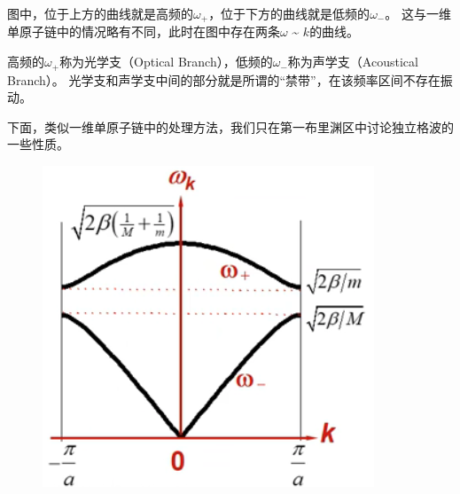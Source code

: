 \documentclass[declarePage]{ecnuthesis}
\begin{document}
图中，位于上方的曲线就是高频的$\omega_+$，位于下方的曲线就是低频的$\omega_-$。%
这与一维单原子链中的情况略有不同，此时在图中存在两条$\omega$ \~{} $k$的曲线。

高频的$\omega_+$称为光学支（Optical Branch），低频的$\omega_-$称为声学支（Acoustical Branch）。%
光学支和声学支中间的部分就是所谓的“禁带”，在该频率区间不存在振动。

下面，类似一维单原子链中的处理方法，我们只在第一布里渊区中讨论独立格波的一些性质。
\begin{figure}[htb]
    \centering
    \includegraphics[width=.33\textwidth]{1DDCDR1.png}
     \label{1DDCDR1}
\end{figure}
\end{document}
